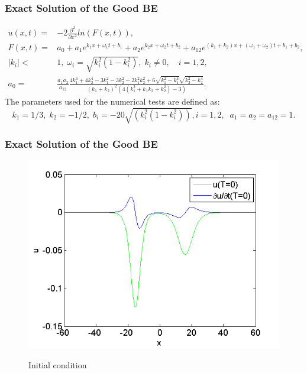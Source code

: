 \documentclass{beamer}
\newcommand{\be}{\begin{equation}}
\newcommand{\ee}{\end{equation}}
\begin{document}
\begin{frame}
\frametitle{Exact Solution of the Good BE}
\begin{align}\label{orgBsqSol}
u(x,t) =& -2 \frac{\partial^2 }{\partial x^2} ln (F(x,t)),
\\
 F(x,t) =& a_0 + a_1 e^{k_1 x + \omega_1 t + b_1} + a_2 e^{k_2 x + \omega_2 t + b_2}  + a_{12} e^{(k_1 + k_2) x + (\omega_1 + \omega_2)  t + b_1 + b_2}, \nonumber
\\
|k_i| <& 1, \; \omega_i = \sqrt{k^2_i(1-k^2_i) }, \; k_i \neq 0, \quad i = 1,2, \nonumber
\\
a_0 =& \frac{a_1 a_2}{a_{12}}\frac{4k_1^4 + 4k_2^4 - 3k_1^2 - 3k_2^2 - 2k_1^2 k_2^2 + 6\sqrt{k_1^2-k_1^4}\sqrt{k_2^2-k_2^4} }{(k_1 + k_2)^2 (4(k_1^2 + k_1 k_2 + k_2^2) - 3)}.\nonumber
\end{align}
The parameters used for the numerical tests are defined as:
\be\label{params}
        k_1 = 1/3,  \; k_2 = -1/2,  \; b_i = -20\sqrt{(k_i^ 2  (1 - k_i ^ 2))}, i=1,2,  \;\; a_1 = a_2 = a_{12} = 1.
\ee

\end{frame}


\begin{frame}
\frametitle{Exact Solution of the Good BE}
\begin{figure}[ht]
	\centering
	\includegraphics[width=0.84\linewidth]{../IC.png}

Initial condition
\end{figure}
\end{frame}
\end{document}
